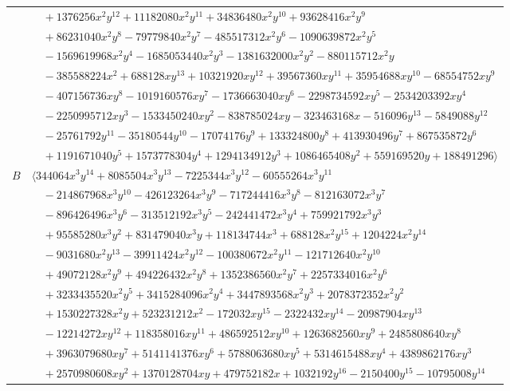 \documentclass[11pt]{article}
\begin{document}
\begin{longtable}{@{}ll@{}}
 & $\quad +1376256x^{2}y^{12}+11182080x^{2}y^{11}+34836480x^{2}y^{10}+93628416x^{2}y^{9}$\\
 & $\quad +86231040x^{2}y^{8}-79779840x^{2}y^{7}-485517312x^{2}y^{6}-1090639872x^{2}y^{5}$\\
 & $\quad -1569619968x^{2}y^{4}-1685053440x^{2}y^{3}-1381632000x^{2}y^{2}-880115712x^{2}y$\\
 & $\quad -385588224x^{2}+688128xy^{13}+10321920xy^{12}+39567360xy^{11}+35954688xy^{10}-68554752xy^{9}$\\
 & $\quad -407156736xy^{8}-1019160576xy^{7}-1736663040xy^{6}-2298734592xy^{5}-2534203392xy^{4}$\\
 & $\quad -2250995712xy^{3}-1533450240xy^{2}-838785024xy-323463168x-516096y^{13}-5849088y^{12}$\\
 & $\quad -25761792y^{11}-35180544y^{10}-17074176y^{9}+133324800y^{8}+413930496y^{7}+867535872y^{6}$\\
 & $\quad +1191671040y^{5}+1573778304y^{4}+1294134912y^{3}+1086465408y^{2}+559169520y+188491296\rangle$\\
$B$ & $\langle 344064x^{3}y^{14}+8085504x^{3}y^{13}-7225344x^{3}y^{12}-60555264x^{3}y^{11}$\\
 & $\quad -214867968x^{3}y^{10}-426123264x^{3}y^{9}-717244416x^{3}y^{8}-812163072x^{3}y^{7}$\\
 & $\quad -896426496x^{3}y^{6}-313512192x^{3}y^{5}-242441472x^{3}y^{4}+759921792x^{3}y^{3}$\\
 & $\quad +95585280x^{3}y^{2}+831479040x^{3}y+118134744x^{3}+688128x^{2}y^{15}+1204224x^{2}y^{14}$\\
 & $\quad -9031680x^{2}y^{13}-39911424x^{2}y^{12}-100380672x^{2}y^{11}-121712640x^{2}y^{10}$\\
 & $\quad +49072128x^{2}y^{9}+494226432x^{2}y^{8}+1352386560x^{2}y^{7}+2257334016x^{2}y^{6}$\\
 & $\quad +3233435520x^{2}y^{5}+3415284096x^{2}y^{4}+3447893568x^{2}y^{3}+2078372352x^{2}y^{2}$\\
 & $\quad +1530227328x^{2}y+523231212x^{2}-172032xy^{15}-2322432xy^{14}-20987904xy^{13}$\\
 & $\quad -12214272xy^{12}+118358016xy^{11}+486592512xy^{10}+1263682560xy^{9}+2485808640xy^{8}$\\
 & $\quad +3963079680xy^{7}+5141141376xy^{6}+5788063680xy^{5}+5314615488xy^{4}+4389862176xy^{3}$\\
 & $\quad +2570980608xy^{2}+1370128704xy+479752182x+1032192y^{16}-2150400y^{15}-10795008y^{14}$\\

\end{longtable}
\end{document}
